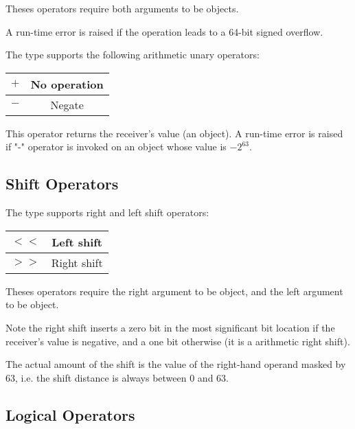Theses operators require both arguments to be  objects.\newline

A run-time error is raised if the operation leads to a 64-bit signed overflow.

The  type supports the following arithmetic unary operators:\newline

\begin{tabular}{|c|c|}
\hline
$+$ & No operation \\
\hline
$-$ & Negate \\
\hline
\end{tabular}

This operator returns the receiver's value (an  object). A run-time error is raised if "-" operator is invoked on an object whose value is $-2^{63}$.






\subsection{Shift Operators}


The  type supports right and left shift operators:\newline

\begin{tabular}{|c|c|}
\hline
$<<$ & Left shift \\
\hline
$>>$ & Right shift \\
\hline
\end{tabular}

Theses operators require the right argument to be  object, and the left argument to be  object.\newline

Note the right shift inserts a zero bit in the most significant bit location if the receiver's value is negative, and a one bit otherwise (it is a arithmetic right shift).\newline

The actual amount of the shift is the value of the right-hand operand masked by 63, i.e. the shift distance is always between 0 and 63.




\subsection{Logical Operators}

